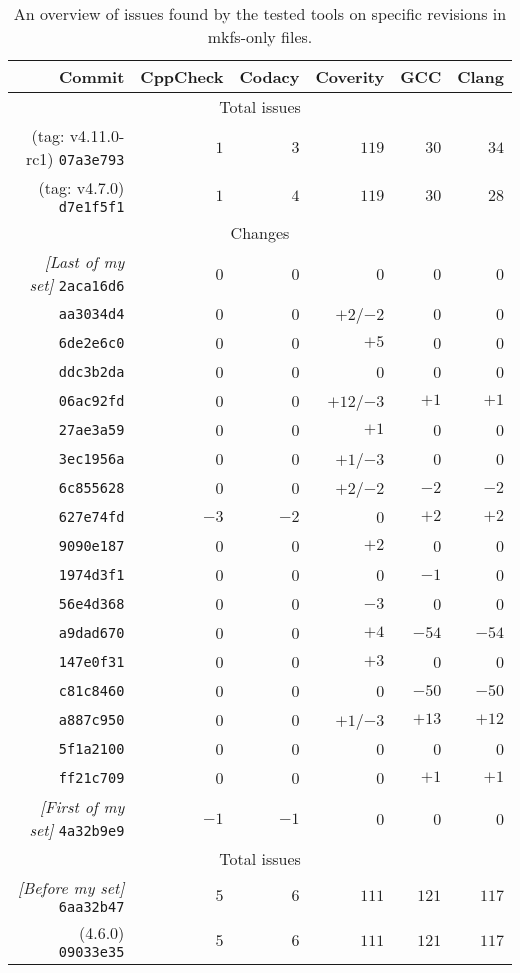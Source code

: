\begin{table}[h]
\begin{tabular}{|r||r|r|r|r|r|}
\hline
Commit & CppCheck & Codacy  & Coverity & GCC & Clang \\
\hline
\hline
\multicolumn{6}{|c|}{Total issues}\\
\hline
(tag: v4.11.0-rc1) {\tt 07a3e793} & $1$ & $3$ & $119$ & $30$ & $34$ \\
\hline
(tag: v4.7.0) {\tt d7e1f5f1} & $1$ & $4$ & $119$ & $30$ & $28$ \\
\hline
\hline
\multicolumn{6}{|c|}{Changes}\\
\hline
{\em [Last of my set]} {\tt 2aca16d6} & 0 & 0 & 0 & 0 & 0 \\
\hline
{\tt aa3034d4} & 0 & 0 & $+2$/$-2$ & 0 & 0 \\
\hline
{\tt 6de2e6c0} & 0 & 0 & $+5$ & 0 & 0 \\
\hline
{\tt ddc3b2da} & 0 & 0 & 0 & 0 & 0\\
\hline
{\tt 06ac92fd} & 0 & 0 & $+12$/$-3$ & $+1$ & $+1$\\
\hline
{\tt 27ae3a59} & 0 & 0 & $+1$ & 0 & 0 \\
\hline
{\tt 3ec1956a} & 0 & 0 & $+1$/$-3$ & 0 & 0 \\
\hline
{\tt 6c855628} & 0 & 0 & $+2$/$-2$ & $-2$ & $-2$ \\
\hline
{\tt 627e74fd} & $-3$ & $-2$ & 0 & $+2$ & $+2$ \\
\hline
{\tt 9090e187} & 0 & 0 & $+2$ & 0 & 0 \\
\hline
{\tt 1974d3f1} & 0 & 0 & 0 & $-1$ & 0 \\
\hline
{\tt 56e4d368} & 0 & 0 & $-3$ & 0 & 0 \\
\hline
{\tt a9dad670} & 0 & 0 & $+4$ & $-54$ & $-54$ \\
\hline
{\tt 147e0f31} & 0 & 0 & $+3$ & 0 & 0 \\
\hline
{\tt c81c8460} & 0 & 0 & 0 & $-50$ & $-50$ \\
\hline
{\tt a887c950} & 0 & 0 & $+1$/$-3$ & $+13$ & $+12$ \\
\hline
{\tt 5f1a2100} & 0 & 0 & 0 & 0 & 0 \\
\hline
{\tt ff21c709} & 0 & 0 & 0 & $+1$ & $+1$ \\
\hline
{\em [First of my set]} {\tt 4a32b9e9} & $-1$ & $-1$ & 0 & 0 & 0 \\
\hline
\hline
\multicolumn{6}{|c|}{Total issues} \\
\hline
{\em [Before my set]} {\tt 6aa32b47} & $5$ & $6$ & $111$ & $121$ & $117$ \\
\hline
(4.6.0) {\tt 09033e35} & $5$ & $6$ & $111$ & $121$ & $117$ \\
\hline
\end{tabular}
\caption{An overview of issues found by the tested tools on specific revisions
	in mkfs-only files.}
\label{tab:results:overview}
\end{table}

